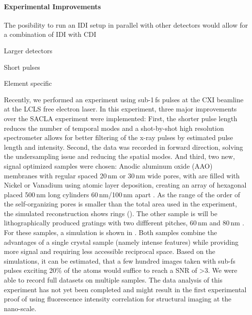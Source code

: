 \paragraph{Experimental Improvements}



The posibility to run an IDI setup in parallel with other detectors would allow for a combination of IDI with CDI

Larger detectors

Short pulses

Element specific 

Recently, we performed an experiment using sub-1\,fs pulses at the CXI beamline at the LCLS free electron laser. In this experiment, three major improvements over the SACLA experiment were implemented: First, the shorter pulse length reduces the number of temporal modes and a shot-by-shot high resolution spectrometer allows for better filtering of the x-ray pulses by estimated pulse length and intensity. Second, the data was recorded in forward direction, solving the undersampling issue and reducing the spatial modes. And third, two new, signal optimized samples were chosen: Anodic aluminum oxide (AAO) membranes with regular spaced 20\,nm or 30\,nm wide pores, with are filled with Nickel or Vanadium using atomic layer deposition, creating an array of hexagonal placed 500\,nm long cylinders 60\,nm/100\,nm apart \cite{carina2019}. As the range of the order of the self-organizing pores is smaller than the total area used in the experiment, the simulated reconstruction shows rings (). 
The other sample is will be lithographically produced gratings with two diffferent pitches, 60\,nm  and 80\,nm \cite{mojarad2015}. For these samples, a simulation is shown in . Both samples combine the advantages of a single crystal sample (namely intense features) while providing more signal and requiring less accessible reciprocal space. 
Based on the simulations, it can be estimated, that a few hundred images taken with sub-fs pulses exciting 20\% of the atoms would suffice to reach a SNR of >3.
We were able to record full datasets on multiple samples. The data analysis of this experiment has not yet been completed and might result in the first experimental proof of using fluorescence intensity correlation for structural imaging at the nano-scale.  



